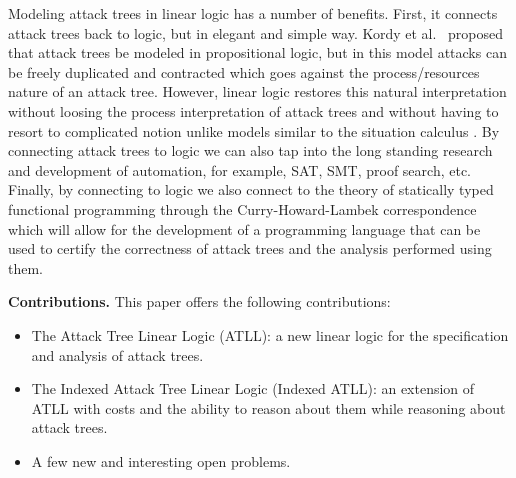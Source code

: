 Modeling attack trees in linear logic has a number of benefits.
First, it connects attack trees back to logic, but in elegant and
simple way.  Kordy et al.~\cite{Kordy2010,Kordy:2012} proposed that
attack trees be modeled in propositional logic, but in this model
attacks can be freely duplicated and contracted which goes against the
process/resources nature of an attack tree.  However, linear logic
restores this natural interpretation without loosing the process
interpretation of attack trees and without having to resort to
complicated notion unlike models similar to the situation calculus
\cite{Samarji2013}.  By connecting attack trees to logic we can also
tap into the long standing research and development of automation, for
example, SAT, SMT, proof search, etc.  Finally, by connecting to logic
we also connect to the theory of statically typed functional
programming through the Curry-Howard-Lambek correspondence which will
allow for the development of a programming language that can be used
to certify the correctness of attack trees and the analysis performed
using them.

\textbf{Contributions.}  This paper offers the following
contributions:
\begin{itemize}
\item The Attack Tree Linear Logic (ATLL): a new linear logic for the
  specification and analysis of attack trees.
\item The Indexed Attack Tree Linear Logic (Indexed ATLL): an
  extension of ATLL with costs and the ability to reason about them
  while reasoning about attack trees.
\item A few new and interesting open problems.
\end{itemize}
